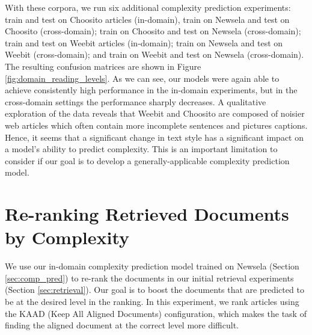 \documentclass[thesis.tex]{subfiles}
\begin{document}

With these corpora, we run six additional complexity prediction experiments: train and test on Choosito articles (in-domain), train on Newsela and test on Choosito (cross-domain); train on Choosito and test on Newsela (cross-domain); train and test on Weebit articles (in-domain); train on Newsela and test on Weebit (cross-domain); and train on Weebit and test on Newsela (cross-domain). The resulting confusion matrices are shown in Figure \ref{fig:domain_reading_levels}. As we can see, our models were again able to achieve consistently high performance in the in-domain experiments, but in the cross-domain settings the performance sharply decreases. A qualitative exploration of the data reveals that Weebit and Choosito are composed of noisier web articles which often contain more incomplete sentences and pictures captions. Hence, it seems that a significant change in text style has a significant impact on a model's ability to predict complexity. This is an important limitation to consider if our goal is to develop a generally-applicable complexity prediction model.

\section{Re-ranking Retrieved Documents by Complexity} \label{sec:rerank_ir}

We use our in-domain complexity prediction model trained on Newsela (Section \ref{sec:comp_pred}) to re-rank the documents in our initial retrieval experiments (Section \ref{sec:retrieval}). Our goal is to boost the documents that are predicted to be at the desired level in the ranking. In this experiment, we rank articles using the KAAD (Keep All Aligned Documents) configuration, which makes the task of finding the aligned document at the correct level more difficult.
\end{document}
